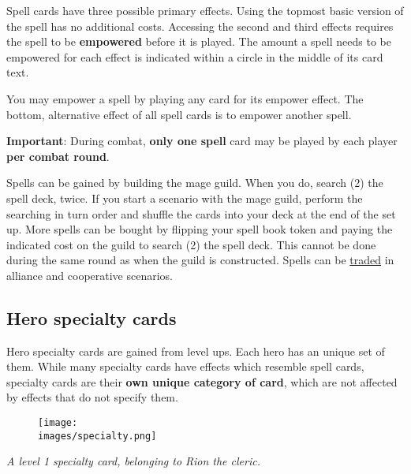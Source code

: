 Spell cards have three possible primary effects. Using the topmost basic version of the spell has no additional costs. Accessing the second and third effects requires the spell to be \textbf{empowered} before it is played. The amount a spell needs to be empowered for each effect is indicated within a circle in the middle of its card text.\par
You may empower a spell by playing any card for its empower  effect. The bottom, alternative effect of all spell cards is to empower another spell.\par
\textbf{Important}: During combat, \textbf{only one spell} card may be played by each player \textbf{per combat round}.\par
Spells can be gained by building the mage guild. When you do, search (2) the spell deck, twice. If you start a scenario with the mage guild, perform the searching in turn order and shuffle the cards into your deck at the end of the set up. More spells can be bought by flipping your spell book token and paying the indicated cost on the guild to search (2) the spell deck. This cannot be done during the same round as when the guild is constructed. Spells can be \hyperlink{Trading}{traded} in alliance and cooperative scenarios.

\subsection*{\hypertarget{Specialty}{Hero specialty cards}}
Hero specialty cards are gained from level ups. Each hero has an unique set of them. While many specialty cards have effects which resemble spell cards, specialty cards are their \textbf{own unique category of card}, which are not affected by effects that do not specify them.
\par

\begin{figure}[h]
\centering
\texttt{[image: \\images/specialty.png]}
\end{figure}
\begin{center}
\textit{A level 1 specialty card, belonging to Rion the cleric.}
\end{center}
